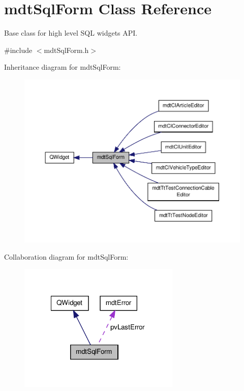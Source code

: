 \hypertarget{classmdt_sql_form}{\section{mdt\-Sql\-Form Class Reference}
\label{classmdt_sql_form}
}


Base class for high level S\-Q\-L widgets A\-P\-I.  




{\ttfamily \#include $<$mdt\-Sql\-Form.\-h$>$}



Inheritance diagram for mdt\-Sql\-Form\-:
\nopagebreak
\begin{figure}[H]
\begin{center}
\leavevmode
\includegraphics[width=350pt]{classmdt_sql_form__inherit__graph}
\end{center}
\end{figure}


Collaboration diagram for mdt\-Sql\-Form\-:
\nopagebreak
\begin{figure}[H]
\begin{center}
\leavevmode
\includegraphics[width=218pt]{classmdt_sql_form__coll__graph}
\end{center}
\end{figure}
